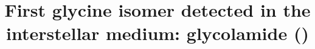 \documentclass[twocolumn]{aastex63}
\begin{document}
\title{First glycine isomer detected in the interstellar medium: glycolamide ()}



\end{document}
